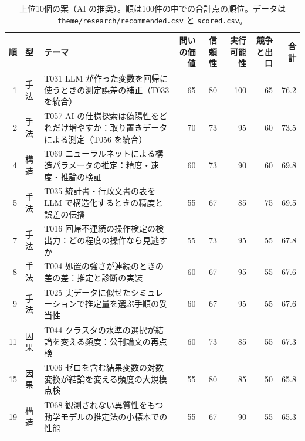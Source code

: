 \begin{table}[htbp]
\centering\small
\begin{tabularx}{\linewidth}{rlXrrrrr}
\toprule
順 & 型 & テーマ & 問いの価値 & 信頼性 & 実行可能性 & 競争と出口 & 合計 \\
\midrule
1 & 手法 & T031 LLM が作った変数を回帰に使うときの測定誤差の補正（T033 を統合） & 65 & 80 & 100 & 65 & 76.2 \\
2 & 手法 & T057 AI の仕様探索は偽陽性をどれだけ増やすか：取り置きデータによる測定（T056 を統合） & 70 & 73 & 95 & 60 & 73.5 \\
4 & 構造 & T069 ニューラルネットによる構造パラメータの推定：精度・速度・推論の検証 & 60 & 73 & 90 & 60 & 69.8 \\
5 & 手法 & T035 統計書・行政文書の表を LLM で構造化するときの精度と誤差の伝播 & 55 & 67 & 85 & 75 & 69.5 \\
7 & 手法 & T016 回帰不連続の操作検定の検出力：どの程度の操作なら見逃すか & 55 & 73 & 95 & 55 & 67.8 \\
8 & 手法 & T004 処置の強さが連続のときの差の差：推定と診断の実装 & 60 & 67 & 95 & 55 & 67.6 \\
9 & 手法 & T025 実データに似せたシミュレーションで推定量を選ぶ手順の妥当性 & 60 & 67 & 95 & 55 & 67.6 \\
11 & 因果 & T044 クラスタの水準の選択が結論を変える頻度：公刊論文の再点検 & 60 & 73 & 85 & 55 & 67.3 \\
15 & 因果 & T006 ゼロを含む結果変数の対数変換が結論を変える頻度の大規模点検 & 55 & 80 & 85 & 50 & 65.8 \\
19 & 構造 & T068 観測されない異質性をもつ動学モデルの推定法の小標本での性能 & 55 & 67 & 90 & 55 & 65.3 \\
\bottomrule
\end{tabularx}
\caption{上位10個の案（AI の推奨）。順は100件の中での合計点の順位。データは \texttt{theme/research/recommended.csv} と \texttt{scored.csv}。}
\label{tab:th-top10}
\end{table}

